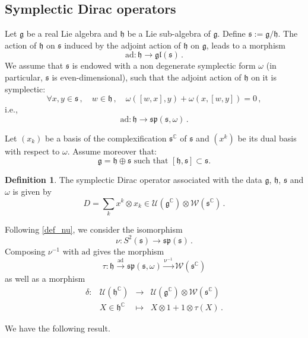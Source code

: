 \documentclass{amsart}[draft,11pt]
\newcommand{\mg}{\mathfrak{g}}
\newcommand{\mh}{\mathfrak{h}}
\newcommand{\ms}{\mathfrak{s}}
\newcommand{\weyl}{\mathcal{W}(\ms^\mathbb{C})}
\newcommand{\fg}{{\mathfrak{g}}}
\newcommand{\fh}{{\mathfrak{h}}}
\numberwithin{equation}{section}
\theoremstyle{definition}
\newtheorem{definition}[theorem]{Definition}
\begin{document}
\subsection{Symplectic Dirac operators}
Let $\mg$ be a real Lie algebra and  $\mh$ be a Lie sub-algebra 
of  $\mg$. Define  $\ms:=\mg/\mh $.  The action of $\mh$
on $\ms$ induced by the adjoint action of $\mh$ on $\mg$, leads to a morphism 
$$ 
\mathrm{ad} \colon 
\mh \to \mathfrak{gl}(\ms)\,.
$$
We assume that $\ms$ is endowed
with a non degenerate symplectic form $\omega$ (in particular, $\ms$ is even-dimensional), such that the adjoint action of
$\mh$ on it is symplectic:
$$
\forall x,y \in \ms\,,\quad w\in \mh\,,
\quad
\omega([w,x],y)+\omega(x,[w,y])=0\,,
$$
i.e., 
$$ 
\mathrm{ad} \colon 
\mh \to \mathfrak{sp}(\ms,\omega)\,.
$$

Let  $(x_k)$ be a basis of the complexification $\ms^\mathbb{C}$ of $\ms$ and $(x^k)$ be its dual basis with respect to $\omega$.
Assume moreover that: 
$$\mg = \mh \oplus \ms\text{ such that }[\mh,\ms]\subset \ms.$$
\begin{definition}
The symplectic Dirac operator associated with the data
$\fg$, $\fh$, $\ms$ and $\omega$ is given by 
\begin{equation*}\label{defdirac}
     D=\sum_k x^k\otimes x_k\in \mathcal{U}(\mg^\mathbb{C}) \otimes \weyl\,. 
\end{equation*}
\end{definition}
Following \eqref{def_nu}, we consider the isomorphism
$$ \nu \colon S^2(\ms) \to \mathfrak{sp}(\ms)\,.$$
Composing $\nu^{-1}$ with $\mathrm{ad}$ gives the morphism
$$\tau \colon \mh \mathop{\longrightarrow}\limits^\mathrm{ad} \mathfrak{sp}(\ms,\omega) \mathop{\longrightarrow}\limits^\mathrm{\nu^{-1}} \weyl
$$
as well as a morphism 
$$
\begin{array}{rccl}
\delta \colon &\mathcal{U}(\mh^\mathbb{C}) & \longrightarrow & \mathcal{U}(\mg^\mathbb{C}) \otimes \weyl \\ 
&X\in \mh^\mathbb{C} & \longmapsto & X\otimes 1 + 1\otimes \tau(X)\,.
\end{array}
$$

We have the following result.
\end{document}
